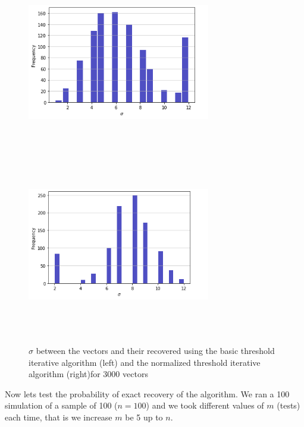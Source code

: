 \begin{figure}[H]
	\includegraphics[height=8cm, width=8cm]{images/hamming_basic}
	\includegraphics[height=8cm, width=8cm]{images/n_hamming}
	\caption{$ \sigma $ between the vectors and their recovered using the basic threshold iterative algorithm (left) and the normalized threshold iterative algorithm (right)for 3000 vectors}
\end{figure}

Now lets test the probability of exact recovery of the algorithm. We ran a 100 simulation of a sample of 100 ($ n =100 $) and we took different values of $ m $ (tests) each time, that is we increase $ m $ be 5 up to $ n $.    

